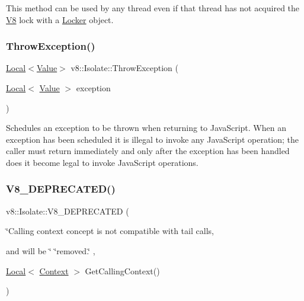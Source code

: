 This method can be used by any thread even if that thread has not acquired the \mbox{\hyperlink{classv8_1_1V8}{V8}} lock with a \mbox{\hyperlink{classv8_1_1Locker}{Locker}} object. \mbox{\label{classv8_1_1Isolate_aba648b3c00dc9f1ef2a22195d99e22e8}} 
\subsubsection{\texorpdfstring{Throw\+Exception()}{ThrowException()}}
{\footnotesize\ttfamily \mbox{\hyperlink{classv8_1_1Local}{Local}}$<$\mbox{\hyperlink{classv8_1_1Value}{Value}}$>$ v8\+::\+Isolate\+::\+Throw\+Exception (\begin{DoxyParamCaption}\item[{\mbox{\hyperlink{classv8_1_1Local}{Local}}$<$ \mbox{\hyperlink{classv8_1_1Value}{Value}} $>$}]{exception }\end{DoxyParamCaption})}

Schedules an exception to be thrown when returning to Java\+Script. When an exception has been scheduled it is illegal to invoke any Java\+Script operation; the caller must return immediately and only after the exception has been handled does it become legal to invoke Java\+Script operations. \mbox{\label{classv8_1_1Isolate_adca05cbb59a222cb96b4456481ec578e}} 
\subsubsection{\texorpdfstring{V8\+\_\+\+D\+E\+P\+R\+E\+C\+A\+T\+E\+D()}{V8\_DEPRECATED()}}
{\footnotesize\ttfamily v8\+::\+Isolate\+::\+V8\+\_\+\+D\+E\+P\+R\+E\+C\+A\+T\+ED (\begin{DoxyParamCaption}\item[{\char`\"{}Calling context concept is not compatible with tail}]{calls,  }\item[{and will be \char`\"{} \char`\"{}removed.\char`\"{}}]{,  }\item[{\mbox{\hyperlink{classv8_1_1Local}{Local}}$<$ \mbox{\hyperlink{classv8_1_1Context}{Context}} $>$ }]{Get\+Calling\+Context() }\end{DoxyParamCaption})}


